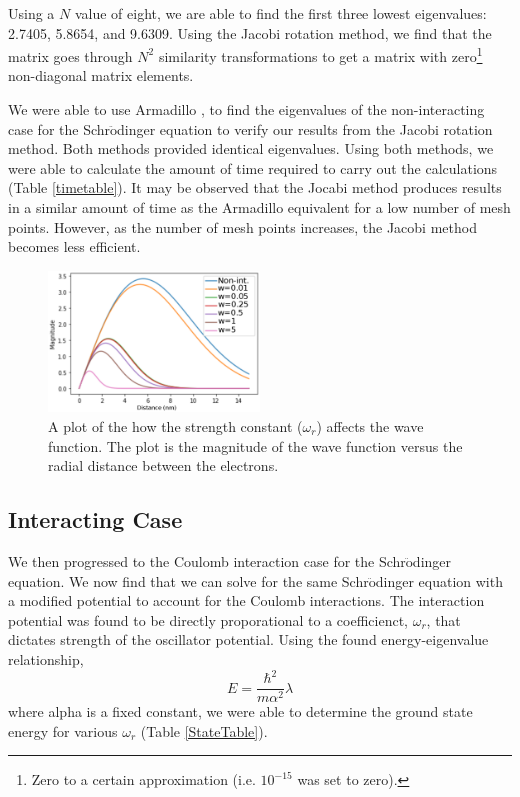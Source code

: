 \documentclass[%
reprint,
superscriptaddress,
showpacs,
nofootinbib,
bibnotes,amsmath,amssymb,aps,
prc, 
]{revtex4-1}
\begin{document}
	Using a $N$ value of eight, we are able to find the first three lowest eigenvalues: 2.7405, 5.8654, and 9.6309.  Using the Jacobi rotation method, we find that the matrix goes through $N^{2}$ similarity transformations to get a matrix with zero\footnote{Zero to a certain approximation (i.e. $10^{-15}$ was set to zero).} non-diagonal matrix elements.


	We were able to use Armadillo \cite{Armadillo}, to find the eigenvalues of the non-interacting case for the Schr$\ddot{\textrm{o}}$dinger equation to verify our results from the Jacobi rotation method. Both methods provided identical eigenvalues.  Using both methods, we were able to calculate the amount of time required to carry out the calculations (Table \ref{timetable}).  It may be observed that the Jocabi method produces results in a similar amount of time as the Armadillo equivalent for a low number of mesh points.  However, as the number of mesh points increases, the Jacobi method becomes less efficient.
	
		
\begin{figure}
	\centering
	\includegraphics[width=0.5\textwidth]{Graph.eps}
	\caption{A plot of the how the strength constant ($\omega_{r}$) affects the wave function.  The plot is the magnitude of the wave function versus the radial distance between the electrons. }
	\label{fig:graph}
\end{figure}

	
	\subsection{Interacting Case}
	
	We then progressed to the Coulomb interaction case for the Schr$\ddot{\textrm{o}}$dinger equation.  We now find that we can solve for the same Schr$\ddot{\textrm{o}}$dinger equation with a modified potential to account for the Coulomb interactions.  The interaction potential was found to be directly proporational to a coefficienct, $\omega_{r}$, that dictates strength of the oscillator potential.  Using the found energy-eigenvalue relationship, \begin{equation}
	E=\frac{\hbar^{2}}{m\alpha^{2}}\lambda
	\end{equation} where alpha is a fixed constant, we were able to determine the ground state energy for various $\omega_{r}$ (Table \ref{StateTable}).
	
\end{document}
